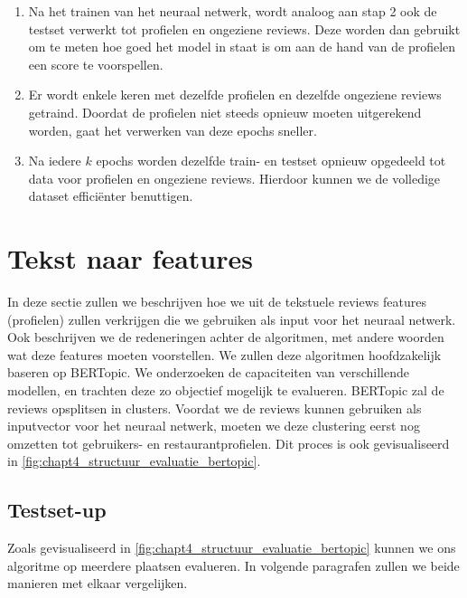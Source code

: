 \begin{enumerate}
    \item Na het trainen van het neuraal netwerk, wordt analoog aan stap 2 ook de testset verwerkt tot profielen en ongeziene reviews. Deze worden dan gebruikt om te meten hoe goed het model in staat is om aan de hand van de profielen een score te voorspellen.

    \item Er wordt enkele keren met dezelfde profielen en dezelfde ongeziene reviews getraind. Doordat de profielen niet steeds opnieuw moeten uitgerekend worden, gaat het verwerken van deze epochs sneller.

    \item Na iedere $k$ epochs worden dezelfde train- en testset opnieuw opgedeeld tot data voor profielen en ongeziene reviews. Hierdoor kunnen we de volledige dataset efficiënter benuttigen.
\end{enumerate}



\section{Tekst naar features}
\label{sec:chapt4_tekst_naar_features}
In deze sectie zullen we beschrijven hoe we uit de tekstuele reviews features (profielen) zullen verkrijgen die we gebruiken als input voor het neuraal netwerk. Ook beschrijven we de redeneringen achter de algoritmen, met andere woorden wat deze features moeten voorstellen. We zullen deze algoritmen hoofdzakelijk baseren op BERTopic. We onderzoeken de capaciteiten van verschillende modellen, en trachten deze zo objectief mogelijk te evalueren. BERTopic zal de reviews opsplitsen in clusters. Voordat we de reviews kunnen gebruiken als inputvector voor het neuraal netwerk, moeten we deze clustering eerst nog omzetten tot gebruikers- en restaurantprofielen. Dit proces is ook gevisualiseerd in \autoref{fig:chapt4_structuur_evaluatie_bertopic}.


\subsection{Testset-up}
\label{sub:chapt4_testsetup}
Zoals gevisualiseerd in \autoref{fig:chapt4_structuur_evaluatie_bertopic} kunnen we ons algoritme op meerdere plaatsen evalueren. In volgende paragrafen zullen we beide manieren met elkaar vergelijken.

